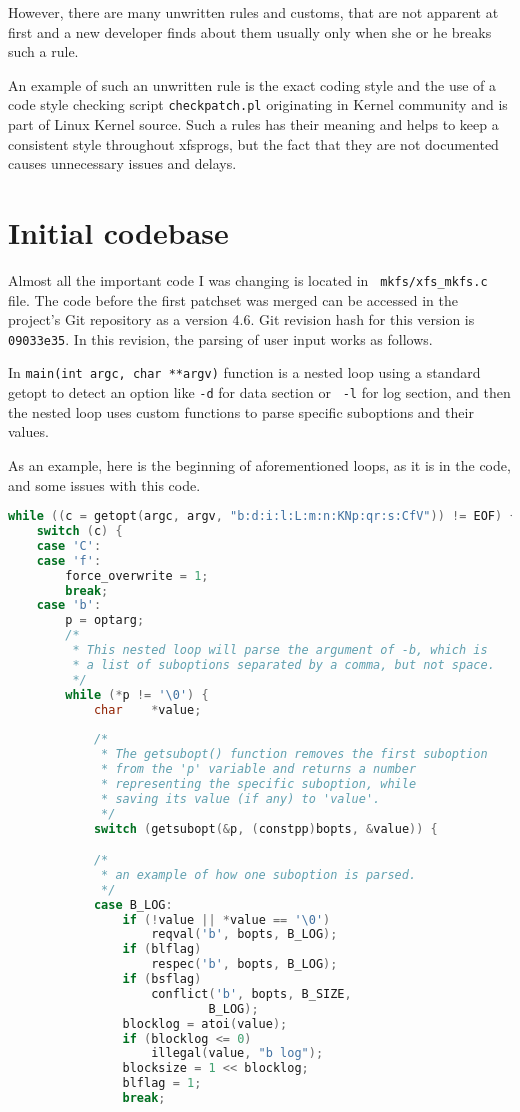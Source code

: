 However, there are many unwritten rules and customs, that are not apparent
at first and a new developer finds about them usually only when she or he
breaks such a rule.

An example of such an unwritten rule is the exact coding style and the use of
a code style checking script {\tt checkpatch.pl} originating in Kernel
community and is part of Linux Kernel source. Such a rules has their
meaning and helps to keep a consistent style throughout xfsprogs, but the
fact that they are not documented causes unnecessary issues and delays.

\section{Initial codebase}\label{chap:refactoring:initialcodebase}

Almost all the important code I was changing is located in {\tt
mkfs/xfs\_mkfs.c} file. The code before the first patchset was merged can
be accessed in the project's Git repository as a version 4.6. Git revision
hash for this version is {\tt 09033e35}. In this revision, the parsing of
user input works as follows.

In {\tt main(int argc, char **argv)} function is a nested loop using a
standard getopt to detect an option like {\tt -d} for data section or {\tt
-l} for log section, and then the nested loop uses custom functions to
parse specific suboptions and their values.

As an example, here is the beginning of aforementioned loops, as it is in
the code, and some issues with this code.

\begin{lstlisting}[frame=none, basicstyle=\footnotesize\ttfamily,
language=C, numbers=none, numberstyle=\tiny\color{black},
caption= {Part of option-parsing loop from mkfs.xfs with additional
comments.},
label={lst:refactoring:loopexample}]
while ((c = getopt(argc, argv, "b:d:i:l:L:m:n:KNp:qr:s:CfV")) != EOF) {
	switch (c) {
	case 'C':
	case 'f':
		force_overwrite = 1;
		break;
	case 'b':
		p = optarg;
		/*
		 * This nested loop will parse the argument of -b, which is
		 * a list of suboptions separated by a comma, but not space.
		 */
		while (*p != '\0') {
			char	*value;
			
			/*
			 * The getsubopt() function removes the first suboption
			 * from the 'p' variable and returns a number
			 * representing the specific suboption, while
			 * saving its value (if any) to 'value'.
			 */
			switch (getsubopt(&p, (constpp)bopts, &value)) {

			/*
			 * an example of how one suboption is parsed.
			 */
			case B_LOG:
				if (!value || *value == '\0')
					reqval('b', bopts, B_LOG);
				if (blflag)
					respec('b', bopts, B_LOG);
				if (bsflag)
					conflict('b', bopts, B_SIZE,
							B_LOG);
				blocklog = atoi(value);
				if (blocklog <= 0)
					illegal(value, "b log");
				blocksize = 1 << blocklog;
				blflag = 1;
				break;
\end{lstlisting}

